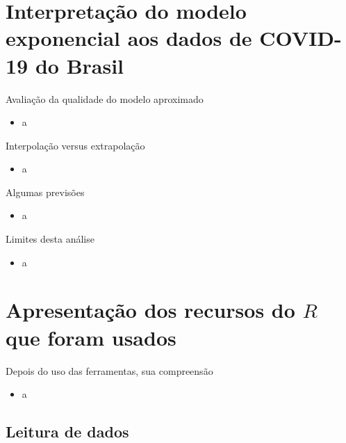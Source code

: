\documentclass[a4paper,10pt]{beamer}
\begin{document}
\section{Interpretação do modelo exponencial aos dados de COVID-19 do Brasil}

\begin{frame}{Avaliação da qualidade do modelo aproximado}
    \begin{itemize}
	\item a
    \end{itemize}

\end{frame}

\begin{frame}{Interpolação versus extrapolação}
    \begin{itemize}
	\item a
    \end{itemize}

\end{frame}

\begin{frame}{Algumas previsões}
    \begin{itemize}
	\item a
    \end{itemize}

\end{frame}

\begin{frame}{Limites desta análise}
    \begin{itemize}
	\item a
    \end{itemize}

\end{frame}

\section{Apresentação dos recursos do 
	  \texorpdfstring{$R$}{R} 
	  que foram usados}

\begin{frame}{Depois do uso das ferramentas, sua compreensão}
    \begin{itemize}
	\item a
    \end{itemize}

\end{frame}

\subsection{Leitura de dados}
\end{document}
